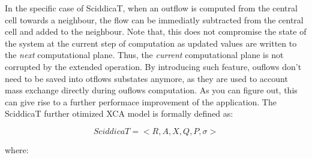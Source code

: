 In the specific case of SciddicaT, when an outflow is computed from
the central cell towards a neighbour, the flow can be immediatly
subtracted from the central cell and added to the neighbour. Note
that, this does not compromise the state of the system at the current
step of computation as updated values are written to the \emph{next}
computational plane. Thus, the \emph{current} computational plane is
not corrupted by the extended operation. By introducing such feature,
ouflows don't need to be saved into otflows substates anymore, as they
are used to account mass exchange directly during ouflows
computation. As you can figure out, this can give rise to a further
performace improvement of the application. The SciddicaT further
otimized XCA model is formally defined as:


$$SciddicaT = < R, A, X, Q , P, \sigma  >$$

where:


